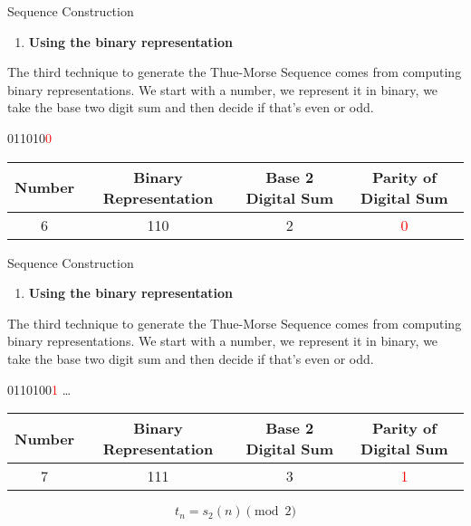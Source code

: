 \documentclass{beamer}
\begin{document}
\begin{frame}{Sequence Construction}
    \scriptsize
    \begin{enumerate}[3]
    \item \textbf{\large Using the binary representation}
    \end{enumerate}
    \begin{center}
        \normalsize The third technique to generate the Thue-Morse Sequence comes from computing binary representations. We start with a number, we represent it in binary, we take the base two digit sum and then decide if that's even or odd.
    \end{center}

    \vfill

    \begin{center} 
        011010\textcolor{red}{0}
    \end{center}

    \vfill

    \begin{center}
    \begin{tabular}{c|c|c|c|}
   
    \textbf{Number} & \textbf{Binary Representation} & \textbf{Base 2 Digital Sum} & \textbf{Parity of Digital Sum} \\ \hline
    6 & 110 & 2 & \textcolor{red}{0}
    \end{tabular}
    \end{center}

\end{frame}

\begin{frame}{Sequence Construction}
    \scriptsize
    \begin{enumerate}[3]
    \item \textbf{\large Using the binary representation}
    \end{enumerate}
    \begin{center}
        \normalsize The third technique to generate the Thue-Morse Sequence comes from computing binary representations. We start with a number, we represent it in binary, we take the base two digit sum and then decide if that's even or odd.
    \end{center}

    \vfill

    \begin{center} 
        0110100\textcolor{red}{1} \dots
    \end{center}

    \vfill

    \begin{center}
    \begin{tabular}{c|c|c|c|}
   
    \textbf{Number} & \textbf{Binary Representation} & \textbf{Base 2 Digital Sum} & \textbf{Parity of Digital Sum} \\ \hline
    7 & 111 & 3 & \textcolor{red}{1}
    \end{tabular}
    \end{center}

    \[
    t_n = s_2(n) \pmod{2}
    \]

\end{frame}
\end{document}
